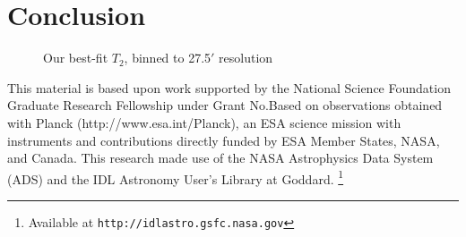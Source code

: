 \documentclass{emulateapj}
\begin{document}

\section{Conclusion}


\label{sec:conclusion}

\begin{figure*} [ht]
\begin{center}
\caption{Our best-fit $T_2$, binned to 27.5$'$ resolution}
\end{center}
\end{figure*}

This material is based upon work supported by the National Science Foundation 
Graduate Research Fellowship under Grant No.Based on observations obtained with
 Planck (http://www.esa.int/Planck), an ESA science mission with instruments 
and contributions directly funded by ESA Member States, NASA, and Canada. This 
research made use of the NASA Astrophysics Data System (ADS) and the IDL 
Astronomy User's Library at Goddard. \footnote{Available at 
\texttt{http://idlastro.gsfc.nasa.gov}}



\end{document}
